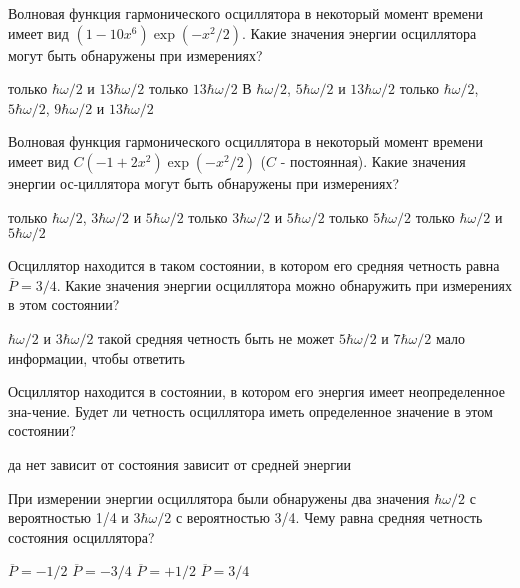 \documentclass[11pt,a4paper]{exam}
\begin{document}
\begin{questions}
\question Волновая функция гармонического осциллятора в некоторый момент времени имеет вид $(1-10{{x}^{6}})\exp (-{{x}^{2}}/2)$. Какие значения энергии осциллятора могут быть обнаружены при измерениях?
\begin{choices}
\choice только $\hbar \omega /2$ и $13\hbar \omega /2$        
\choice только $13\hbar \omega /2$
В $\hbar \omega /2$, $5\hbar \omega /2$ и $13\hbar \omega /2$        
\choice только $\hbar \omega /2$, $5\hbar \omega /2$, $9\hbar \omega /2$ и $13\hbar \omega /2$
\end{choices}

\question Волновая функция гармонического осциллятора в некоторый момент времени имеет вид $C(-1+2{{x}^{2}})\exp (-{{x}^{2}}/2)$ ($C$ - постоянная). Какие значения энергии ос-циллятора могут быть обнаружены при измерениях?
\begin{choices}
\choice только $\hbar \omega /2$, $3\hbar \omega /2$ и $5\hbar \omega /2$       
\choice только $3\hbar \omega /2$ и $5\hbar \omega /2$
\choice только $5\hbar \omega /2$              
\choice  только $\hbar \omega /2$ и $5\hbar \omega /2$
\end{choices}

\question Осциллятор находится в таком состоянии, в котором его средняя четность равна $\overline{P}=3/4$. Какие значения энергии осциллятора можно обнаружить при измерениях в этом состоянии?
\begin{choices}
\choice $\hbar \omega /2$ и $3\hbar \omega /2$       
\choice такой средняя четность быть не может
\choice $5\hbar \omega /2$ и $7\hbar \omega /2$         
\choice мало информации, чтобы ответить
\end{choices}

\question Осциллятор находится в состоянии, в котором его энергия имеет неопределенное зна-чение. Будет ли четность осциллятора иметь определенное значение в этом состоянии?
\begin{choices}
\choice да    
\choice нет      
\choice зависит от состояния    
\choice зависит от средней энергии
\end{choices}

\question При измерении энергии осциллятора были обнаружены два значения $\hbar \omega /2$ с вероятностью 1/4 и $3\hbar \omega /2$ с вероятностью 3/4. Чему равна средняя четность состояния осциллятора?
\begin{choices}
\choice $\overline{P}=-1/2$     
\choice $\overline{P}=-3/4$     
\choice $\overline{P}=+1/2$     
\choice $\overline{P}=3/4$
\end{choices}


\end{questions}
\end{document}
